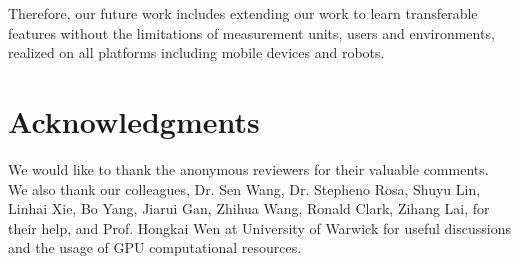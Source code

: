 \documentclass[letterpaper]{article}
\begin{document}
Therefore, our future work includes extending our work to learn transferable features without the limitations of measurement units, users and environments, realized on all platforms including mobile devices and robots. %

\section{ Acknowledgments}
We would like to thank the anonymous reviewers for their valuable comments. We also thank our colleagues, Dr. Sen Wang, Dr. Stepheno Rosa, Shuyu Lin, Linhai Xie, Bo Yang, Jiarui Gan, Zhihua Wang, Ronald Clark, Zihang Lai, for their help, and Prof. Hongkai Wen at University of Warwick for useful discussions and the usage of GPU computational resources.



\end{document}
